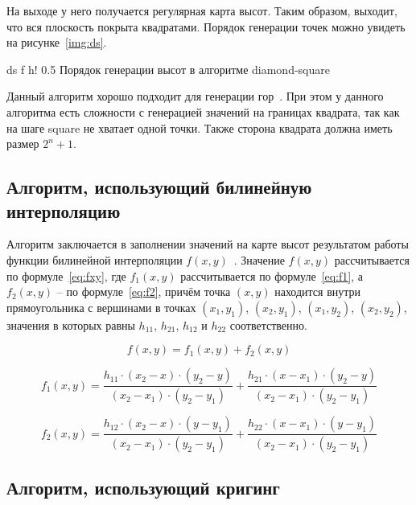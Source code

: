 На выходе у него получается регулярная карта высот. Таким образом, выходит, что вся плоскость покрыта квадратами. Порядок генерации точек можно увидеть на рисунке~\ref{img:ds}. 

\FloatBarrier
{}
{ds} %
{f} %
{h!} %
{0.5\textwidth} %
{Порядок генерации высот в алгоритме diamond-square~\cite{images}} %
\FloatBarrier

Данный алгоритм хорошо подходит для генерации гор~\cite{landscapes}. При этом у данного алгоритма есть сложности с генерацией значений на границах квадрата, так как на шаге square не хватает одной точки. Также сторона квадрата должна иметь размер $2^n+1$.   
 
\subsection{Алгоритм, использующий билинейную интерполяцию}
 
Алгоритм заключается в заполнении значений на карте высот результатом работы функции билинейной интерполяции $f(x, y)$~\cite{Voronezh}. Значение $f(x, y)$ рассчитывается по формуле~\ref{eq:fxy}, где $f_1(x,y)$ рассчитывается по формуле~\ref{eq:f1}, а $f_2(x,y)$ -- по формуле~\ref{eq:f2}, причём точка $(x, y)$ находится внутри прямоугольника с вершинами в точках $(x_1, y_1)$, $(x_2, y_1)$, $(x_1, y_2)$, $(x_2, y_2)$, значения в которых равны $h_{11}$, $h_{21}$, $h_{12}$ и $h_{22}$ соответственно. 

\begin{equation}
	\label{eq:fxy}
	f(x,y)=f_1(x,y)+f_2(x,y)
\end{equation}

\begin{equation}
	\label{eq:f1}
	f_1(x,y)=\frac{h_{11}\cdot(x_2-x)\cdot(y_2-y)}{(x_2-x_1)\cdot(y_2-y_1)}+\frac{h_{21}\cdot(x-x_1)\cdot(y_2-y)}{(x_2-x_1)\cdot(y_2-y_1)}
\end{equation}

\begin{equation}
	\label{eq:f2}
	f_2(x,y)=\frac{h_{12}\cdot(x_2-x)\cdot(y-y_1)}{(x_2-x_1)\cdot(y_2-y_1)}+\frac{h_{22}\cdot(x-x_1)\cdot(y-y_1)}{(x_2-x_1)\cdot(y_2-y_1)}
\end{equation}

\subsection{Алгоритм, использующий кригинг}

